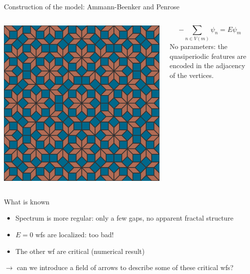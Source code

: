 \documentclass[xcolor=x11names,compress,professionalfonts]{beamer}
\renewcommand{\(}{\begin{columns}}
\renewcommand{\)}{\end{columns}}
\newcommand{\<}[1]{\begin{column}{#1}}
\renewcommand{\>}{\end{column}}
\begin{document}
\begin{frame}{Construction of the model: Ammann-Beenker and Penrose}
\begin{columns}
\begin{column}{5cm}
{\centering
\includegraphics[scale=.1]{img/ammann-beenker.png}

}
\end{column}
\begin{column}{5cm}
\[
	-\sum_{n \in V(m)} \psi_n = E \psi_m
\]
No parameters: the quasiperiodic features are encoded in the adjacency of the vertices.
\end{column}
\end{columns}
\end{frame}

\begin{frame}{What is known}
\begin{itemize}
	\item Spectrum is more regular: only a few gaps, no apparent fractal structure
	\item $E = 0$ wfs are localized: too bad!
	\item The other wf are critical (numerical result)
\end{itemize}
$\rightarrow$ can we introduce a field of arrows to describe some of these critical wfs?
\end{frame}
\end{document}
